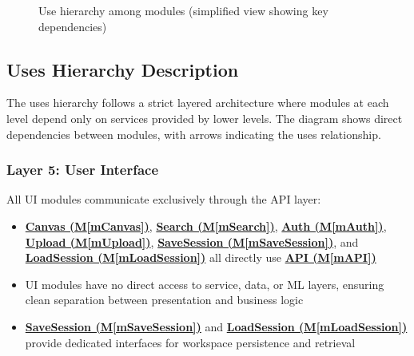 \documentclass[12pt, titlepage]{article}
\newcommand{\mref}[1]{M\ref{#1}}
\begin{document}
\begin{figure}[H]
\caption{Use hierarchy among modules (simplified view showing key dependencies)}
\label{FigUH}
\end{figure}

\subsection{Uses Hierarchy Description}

The uses hierarchy follows a strict layered architecture where modules at each level depend only on services provided by lower levels. The diagram shows direct dependencies between modules, with arrows indicating the uses relationship.

\subsubsection{Layer 5: User Interface}
All UI modules communicate exclusively through the API layer:
\begin{itemize}
\item \hyperref[mCanvas]{\textbf{Canvas (\mref{mCanvas})}}, \hyperref[mSearch]{\textbf{Search (\mref{mSearch})}}, \hyperref[mAuth]{\textbf{Auth (\mref{mAuth})}}, \hyperref[mUpload]{\textbf{Upload (\mref{mUpload})}}, \hyperref[mSaveSession]{\textbf{SaveSession (\mref{mSaveSession})}}, and \hyperref[mLoadSession]{\textbf{LoadSession (\mref{mLoadSession})}} all directly use \hyperref[mAPI]{\textbf{API (\mref{mAPI})}}
\item UI modules have no direct access to service, data, or ML layers, ensuring clean separation between presentation and business logic
\item \hyperref[mSaveSession]{\textbf{SaveSession (\mref{mSaveSession})}} and \hyperref[mLoadSession]{\textbf{LoadSession (\mref{mLoadSession})}} provide dedicated interfaces for workspace persistence and retrieval
\end{itemize}
\end{document}

